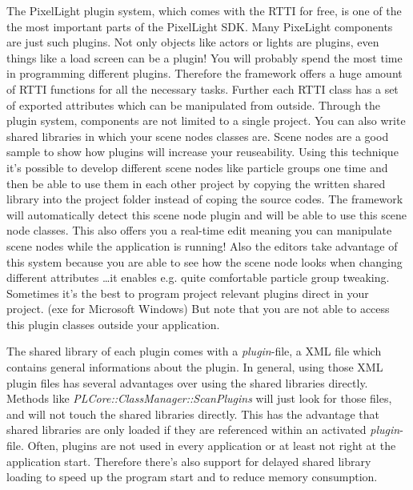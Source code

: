 The PixelLight plugin system, which comes with the RTTI for free, is one of the the most important parts of the PixelLight SDK. Many PixeLight components are just such plugins. Not only objects like actors or lights are plugins, even things like a load screen can be a plugin! You will probably spend the most time in programming different plugins. Therefore the framework offers a huge amount of RTTI functions for all the necessary tasks. Further each RTTI class has a set of exported attributes which can be manipulated from outside. Through the plugin system, components are not limited to a single project. You can also write shared libraries in which your scene nodes classes are. Scene nodes are a good sample to show how plugins will increase your reuseability. Using this technique it's possible to develop different scene nodes like particle groups one time and then be able to use them in each other project by copying the written shared library into the project folder instead of coping the source codes. The framework will automatically detect this scene node plugin and will be able to use this scene node classes. This also offers you a real-time edit meaning you can manipulate scene nodes while the application is running! Also the editors take advantage of this system because you are able to see how the scene node looks when changing different attributes \ldots it enables e.g. quite comfortable particle group tweaking. Sometimes it's the best to program project relevant plugins direct in your project. (exe for Microsoft Windows) But note that you are not able to access this plugin classes outside your application.

The shared library of each plugin comes with a \emph{plugin}-file, a XML file which contains general informations about the plugin. In general, using those XML plugin files has several advantages over using the shared libraries directly. Methods like \emph{PLCore::ClassManager::ScanPlugins} will just look for those files, and will not touch the shared libraries directly. This has the advantage that shared libraries are only loaded if they are referenced within an activated \emph{plugin}-file. Often, plugins are not used in every application or at least not right at the application start. Therefore there's also support for delayed shared library loading to speed up the program start and to reduce memory consumption.

